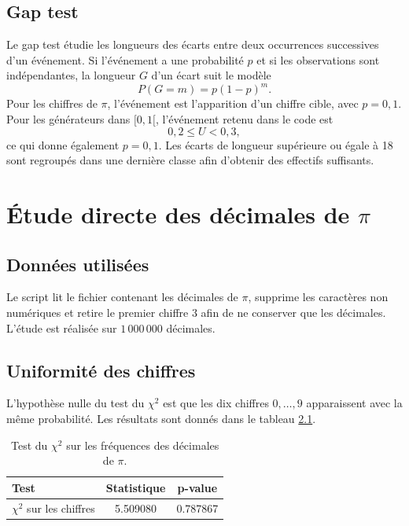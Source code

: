 \documentclass[11pt,a4paper]{report}
\begin{document}
\section{Gap test}

Le gap test étudie les longueurs des écarts entre deux occurrences successives d'un événement. Si l'événement a une probabilité $p$ et si les observations sont indépendantes, la longueur $G$ d'un écart suit le modèle
\[
P(G=m)=p(1-p)^m.
\]
Pour les chiffres de $\pi$, l'événement est l'apparition d'un chiffre cible, avec $p=0{,}1$. Pour les générateurs dans $[0,1[$, l'événement retenu dans le code est
\[
0{,}2 \leq U < 0{,}3,
\]
ce qui donne également $p=0{,}1$. Les écarts de longueur supérieure ou égale à 18 sont regroupés dans une dernière classe afin d'obtenir des effectifs suffisants.

\chapter{Étude directe des décimales de $\pi$}

\section{Données utilisées}

Le script lit le fichier contenant les décimales de $\pi$, supprime les caractères non numériques et retire le premier chiffre 3 afin de ne conserver que les décimales. L'étude est réalisée sur $1\,000\,000$ décimales.

\section{Uniformité des chiffres}

L'hypothèse nulle du test du $\chi^2$ est que les dix chiffres $0,\ldots,9$ apparaissent avec la même probabilité. Les résultats sont donnés dans le tableau \ref{tab:digits_chi2}.

\begin{table}[H]
\centering
\begin{tabular}{lcc}
\toprule
Test & Statistique & p-value \\
\midrule
$\chi^2$ sur les chiffres & 5.509080 & 0.787867 \\
\bottomrule
\end{tabular}
\caption{Test du $\chi^2$ sur les fréquences des décimales de $\pi$.}
\label{tab:digits_chi2}
\end{table}
\end{document}
